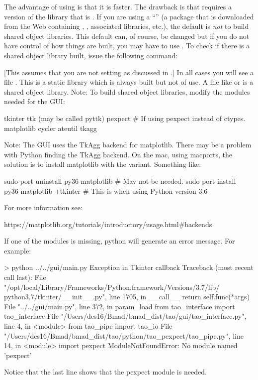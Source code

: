 The advantage of using  is that it is faster. The drawback is that  requires a
version of the \tao library that is . If you are using a \bmad
``'' (a package that is downloaded from the Web containing \bmad, \tao, associated
libraries, etc.), the default is {\em not} to build shared object libraries. This default can, of
course, be changed but if you do not have control of how things are built, you may have to use
. To check if there is a shared object library built, issue the following command:
[This assumes that you are not setting  as discussed in .]
In all cases you will see a file . This is a static library which is always built but
not of use. A file like  or  is a shared object library. Note: To
build shared object libraries, modify the modules needed for the GUI:
\begin{example}
  tkinter
  ttk (may be called pyttk)
  pexpect         # If using pexpect instead of ctypes.
  matplotlib
  cycler
  ateutil
  tkagg
\end{example}
Note: The GUI uses the TkAgg backend for matplotlib. There may be a problem with Python finding the
TkAgg backend. On the mac, using macports, the solution is to install matplotlib with the
 variant. Something like:
\begin{example}
  sudo port uninstall py36-matplotlib           # May not be needed.
  sudo port install  py36-matplotlib +tkinter   # This is when using Python version 3.6
\end{example}
For more information see:
\begin{example}
  https://matplotlib.org/tutorials/introductory/usage.html#backends
\end{example}

If one of the modules is missing, python will generate an error message. For example:
\begin{example}
> python ../../gui/main.py
Exception in Tkinter callback
Traceback (most recent call last):
  File "/opt/local/Library/Frameworks/Python.framework/Versions/3.7/lib/
                            python3.7/tkinter/__init__.py", line 1705, in __call__
    return self.func(*args)
  File "../../gui/main.py", line 372, in param_load
    from tao_interface import tao_interface
  File "/Users/dcs16/Bmad/bmad_dist/tao/gui/tao_interface.py", line 4, in <module>
    from tao_pipe import tao_io
  File "/Users/dcs16/Bmad/bmad_dist/tao/python/tao_pexpect/tao_pipe.py", line 14, in <module>
    import pexpect
ModuleNotFoundError: No module named 'pexpect'
\end{example}
Notice that the last line shows that the pexpect module is needed.

